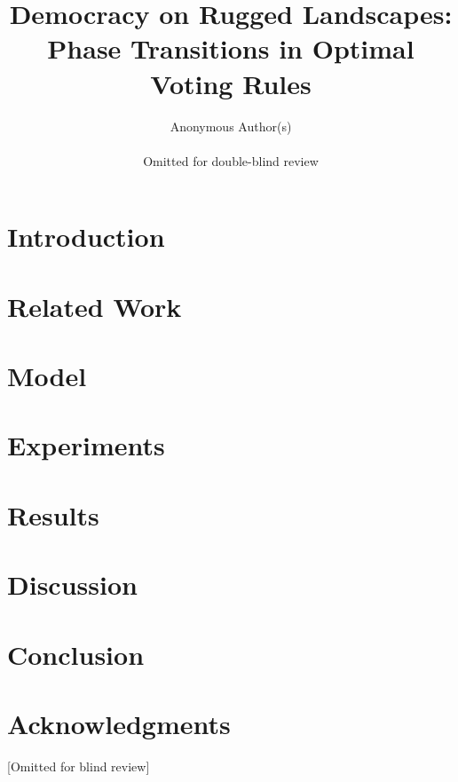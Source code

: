 \documentclass[letterpaper]{article}
\title{Democracy on Rugged Landscapes: Phase Transitions in Optimal Voting Rules}
\author{
    Anonymous Author(s) \\
    \mbox{}\\
    Omitted for double-blind review
}
\begin{document}
\maketitle

\begin{abstract}

\end{abstract}

\section{Introduction}


\section{Related Work}


\section{Model}


\section{Experiments}


\section{Results}


\section{Discussion}


\section{Conclusion}


\section{Acknowledgments}
[Omitted for blind review]

\footnotesize


\end{document}
